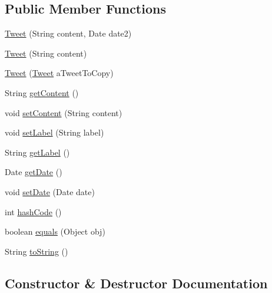 \subsection*{Public Member Functions}
\begin{DoxyCompactItemize}
\item 
\mbox{\hyperlink{classbridges_1_1data__src__dependent_1_1_tweet_a615278c2672b2cb310d3c645566ad5cd}{Tweet}} (String content, Date date2)
\item 
\mbox{\hyperlink{classbridges_1_1data__src__dependent_1_1_tweet_a611e969f630c86098b204cfb4655f79b}{Tweet}} (String content)
\item 
\mbox{\hyperlink{classbridges_1_1data__src__dependent_1_1_tweet_a0b0ee5fa9a6221da95020bd5f78667d9}{Tweet}} (\mbox{\hyperlink{classbridges_1_1data__src__dependent_1_1_tweet}{Tweet}} a\+Tweet\+To\+Copy)
\item 
String \mbox{\hyperlink{classbridges_1_1data__src__dependent_1_1_tweet_a9b48f1ffc14fea21eb8a3e742601974a}{get\+Content}} ()
\item 
void \mbox{\hyperlink{classbridges_1_1data__src__dependent_1_1_tweet_a80ac618b5817392ce356657b2bf4145a}{set\+Content}} (String content)
\item 
void \mbox{\hyperlink{classbridges_1_1data__src__dependent_1_1_tweet_aa193633f4f61cc957f05a1c551f18822}{set\+Label}} (String label)
\item 
String \mbox{\hyperlink{classbridges_1_1data__src__dependent_1_1_tweet_a4b31431e42327efa953adde4c15cf168}{get\+Label}} ()
\item 
Date \mbox{\hyperlink{classbridges_1_1data__src__dependent_1_1_tweet_a801b0b5ea0127746c9c8ec0fc5e35ac2}{get\+Date}} ()
\item 
void \mbox{\hyperlink{classbridges_1_1data__src__dependent_1_1_tweet_a1a57c028bb87ad4e94af496a7260ffe9}{set\+Date}} (Date date)
\item 
int \mbox{\hyperlink{classbridges_1_1data__src__dependent_1_1_tweet_adf7dadcda59b68bb00b42480e4ad9956}{hash\+Code}} ()
\item 
boolean \mbox{\hyperlink{classbridges_1_1data__src__dependent_1_1_tweet_ae5edb76b9dd0f76b56eb40aa7c8cc077}{equals}} (Object obj)
\item 
String \mbox{\hyperlink{classbridges_1_1data__src__dependent_1_1_tweet_adfba67504a7463a7f16aff46d2bb893f}{to\+String}} ()
\end{DoxyCompactItemize}


\subsection{Constructor \& Destructor Documentation}
\mbox{\label{classbridges_1_1data__src__dependent_1_1_tweet_a615278c2672b2cb310d3c645566ad5cd}} 
